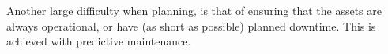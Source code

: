 Another large difficulty when planning, is that of ensuring that the assets are always operational, or have (as short as possible) planned downtime. This is achieved with predictive maintenance.
%

